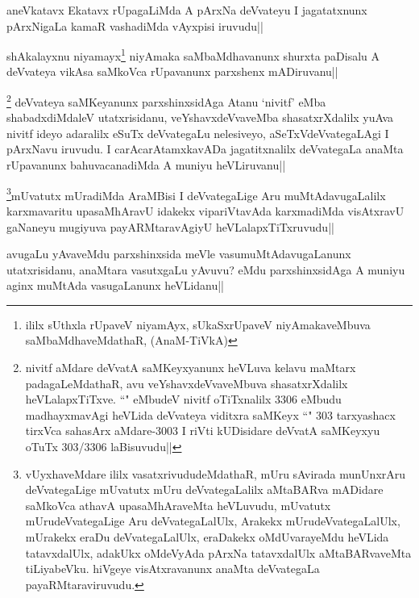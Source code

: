 \begin{artha}
aneVkatavx Ekatavx rUpagaLiMda A pArxNa deVvateyu I jagatatxnunx pArxNigaLa kamaR vashadiMda vAyxpisi iruvudu||
\end{artha}

\begin{artha}
shAkalayxnu niyamayx\footnote[2]{ililx sUthxla rUpaveV niyamAyx, sUkaSxrUpaveV niyAmakaveMbuva saMbaMdhaveMdathaR, (AnaM-TiVkA)} niyAmaka saMbaMdhavanunx shurxta paDisalu A deVvateya vikAsa saMkoVca rUpavanunx parxshenx mADiruvanu||
\end{artha}

\begin{artha}
\footnote[3]{nivitf aMdare deVvatA saMKeyxyanunx heVLuva kelavu maMtarx padagaLeMdathaR, avu veYshavxdeVvaveMbuva shasatxrXdalilx heVLalapxTiTxve. ``\stext " eMbudeV nivitf oTiTxnalilx 3306 eMbudu madhayxmavAgi heVLida deVvateya viditxra saMKeyx ``\stext " 303  tarxyashacx tirxVca sahasArx aMdare-3003 I riVti kUDisidare deVvatA saMKeyxyu oTuTx 303/3306 laBisuvudu||} deVvateya saMKeyanunx parxshinxsidAga Atanu `nivitf' eMba shabadxdiMdaleV utatxrisidanu, veYshavxdeVvaveMba shasatxrXdalilx yuAva nivitf ideyo adaralilx eSuTx deVvategaLu nelesiveyo, aSeTxVdeVvategaLAgi I pArxNavu iruvudu. I carAcarAtamxkavADa jagatitxnalilx deVvategaLa anaMta rUpavanunx bahuvacanadiMda A muniyu heVLiruvanu||
\end{artha}%

\begin{artha}
\footnote[1]{vUyxhaveMdare ililx vasatxrivududeMdathaR, mUru sAvirada munUnxrAru deVvategaLige mUvatutx mUru deVvategaLalilx aMtaBARva mADidare saMkoVca athavA upasaMhAraveMta heVLuvudu, mUvatutx mUrudeVvategaLige Aru deVvategaLalUlx, Arakekx mUrudeVvategaLalUlx, mUrakekx eraDu deVvategaLalUlx, eraDakekx oMdUvarayeMdu heVLida tatavxdalUlx, adakUkx oMdeVyAda pArxNa tatavxdalUlx aMtaBARvaveMta tiLiyabeVku. hiVgeye visAtxravanunx anaMta deVvategaLa payaRMtaraviruvudu.}mUvatutx mUradiMda AraMBisi I deVvategaLige Aru muMtAdavugaLalilx karxmavaritu upasaMhAravU idakekx vipariVtavAda karxmadiMda  visAtxravU gaNaneyu mugiyuva payARMtaravAgiyU heVLalapxTiTxruvudu||
\end{artha}

\begin{artha}
avugaLu yAvaveMdu parxshinxsida meVle vasumuMtAdavugaLanunx utatxrisidanu, anaMtara vasutxgaLu yAvuvu? eMdu parxshinxsidAga A muniyu aginx muMtAda vasugaLanunx heVLidanu||
\end{artha}

